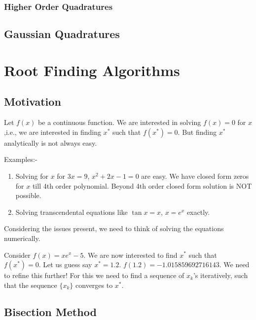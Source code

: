 \documentclass[
]{book}
\begin{document}
\hypertarget{higher-order-quadratures}{%
\subsection{Higher Order Quadratures}\label{higher-order-quadratures}}

\hypertarget{gaussian-quadratures}{%
\section{Gaussian Quadratures}\label{gaussian-quadratures}}

\hypertarget{root-finding-algorithms}{%
\chapter{Root Finding Algorithms}\label{root-finding-algorithms}}

\hypertarget{motivation-2}{%
\section{Motivation}\label{motivation-2}}

Let \(f(x)\) be a continuous function. We are interested in solving \(f(x)=0\) for \(x\),i.e., we are interested in finding \(x^*\) such that \(f(x^*)=0\). But finding \(x^*\) analytically is not always easy.

Examples:-

\begin{enumerate}
\def\labelenumi{\arabic{enumi}.}
\item
  Solving for \(x\) for \(3x=9\), \(x^2+2x-1=0\) are easy. We have closed form zeros for \(x\) till 4th order polynomial. Beyond 4th order closed form solution is NOT possible.
\item
  Solving transcendental equations like \(\tan x = x\), \(x=e^x\) exactly.
\end{enumerate}

Considering the issues present, we need to think of solving the equations numerically.

Consider \(f(x) = xe^x-5\). We are now interested to find \(x^*\) such that \(f(x^*)=0\). Let us guess say \(x^*=1.2\). \(f(1.2) = -1.015859692716143\). We need to refine this further! For this we need to find a sequence of \(x_k\)'s iteratively, such that the sequence \(\{x_k\}\) converges to \(x^*\).

\hypertarget{bisection-method}{%
\section{Bisection Method}\label{bisection-method}}
\end{document}
